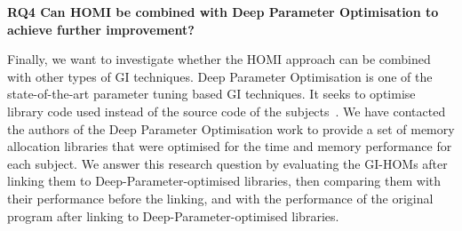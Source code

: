 \documentclass[oribibl]{llncs}
\begin{document}
\vspace{2mm}
\noindent\textbf{RQ4 Can HOMI be combined with Deep Parameter Optimisation to achieve further improvement?}
\vspace{2mm}

Finally, we want to investigate whether the HOMI approach can be combined with other types of GI techniques. Deep Parameter Optimisation is one of the state-of-the-art parameter tuning based GI techniques. It seeks to optimise library code used instead of the source code of the subjects~\cite{Wu:2015:DPO:2739480.2754648}. We have contacted the authors of the Deep Parameter Optimisation work to provide a set of memory allocation libraries that were optimised for the time and memory performance for each subject. We answer this research question by evaluating the GI-HOMs after linking them to Deep-Parameter-optimised libraries, then comparing them with their performance before the linking, and with the performance of the original program after linking to Deep-Parameter-optimised libraries.
\end{document}

